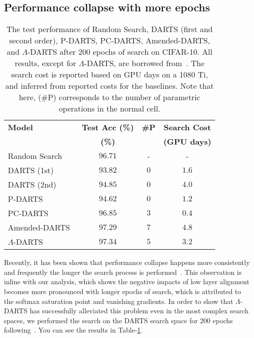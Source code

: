\documentclass{article} \usepackage{fancyhdr, iclr2023_conference, times}
\newcommand{\mydarts}{$\Lambda$-DARTS\xspace}
\newcommand{\lambdafn}{layer alignment\xspace}
\begin{document}
\subsection{Performance collapse with more epochs}
\label{appndx:more-epochs}
\par \begin{table}[t]
\centering
\caption{The test performance of Random Search, DARTS (first and second order), P-DARTS, PC-DARTS, Amended-DARTS, and \mydarts after $200$ epochs of search on CIFAR-10. All results, except for \mydarts, are borrowed from~\citep{DBLP:journals/ijcv/ChenXWT21}. The search cost is reported based on GPU days on a 1080 Ti, and inferred from reported costs for the baselines. Note that here, (\#P) corresponds to the number of parametric operations in the normal cell.} 
\label{table:200epochs}
\begin{tabular}{l|c|c|c}
\textbf{Model} & \textbf{Test Acc (\%)} & \textbf{\#P} & \textbf{Search Cost} \\ 
&\textbf{(\%)} & & \textbf{(GPU days)}\\\hline
    Random Search~\citep{DBLP:journals/corr/abs-1910-11831} & $96.71$ & - & - \\\hline 
    DARTS (1st)~\citep{DBLP:conf/iclr/LiuSY19} & $93.82$ & $0$ & $1.6$ \\
    DARTS (2nd)~\citep{DBLP:conf/iclr/LiuSY19} & $94.85$ & $0$ & $4.0$ \\
    P-DARTS~\citep{DBLP:journals/ijcv/ChenXWT21} & $94.62$ & $0$ & $1.2$ \\
    PC-DARTS~\citep{DBLP:conf/iclr/XuX0CQ0X20} & $96.85$ & $3$ & $0.4$\\
    Amended-DARTS~\citep{DBLP:journals/corr/abs-1910-11831} & $97.29$ & $7$ & $4.8$ \\ \hline
    \mydarts & $\mathbf{97.34}$ & $5$ & $3.2$ \\
\end{tabular}
\end{table}
Recently, it has been shown that performance collapse happens more consistently and frequently the longer the search process is performed~\citep{DBLP:journals/corr/abs-1910-11831}. This observation is inline with our analysis, which shows the negative impacts of low \lambdafn becomes more pronounced with longer epochs of search, which is attributed to the softmax saturation point and vanishing gradients. In order to show that \mydarts has successfully alleviated this problem even in the most complex search spaces, we performed the search on the DARTS search space for $200$ epochs following~\citep{DBLP:journals/corr/abs-1910-11831}. You can see the results in Table-\ref{table:200epochs}.
\end{document}
